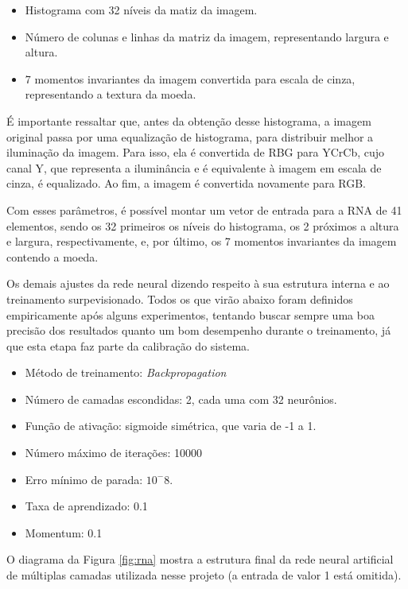 \documentclass[10pt,journal,compsoc]{IEEEtran}
\begin{document}
\begin{itemize}  
\item Histograma com 32 níveis da matiz da imagem.
\item Número de colunas e linhas da matriz da imagem, representando largura e altura.
\item 7 momentos invariantes da imagem convertida para escala de cinza, representando a textura da moeda.
\end{itemize}

É importante ressaltar que, antes da obtenção desse histograma, a imagem original passa por uma equalização de histograma, para distribuir melhor a iluminação da imagem. Para isso, ela é convertida de RBG para YCrCb, cujo canal Y, que representa a iluminância e é equivalente à imagem em escala de cinza, é equalizado. Ao fim, a imagem é convertida novamente para RGB. 

Com esses parâmetros, é possível montar um vetor de entrada para a RNA  de 41 elementos, sendo os 32 primeiros os níveis do histograma, os 2 próximos a altura e largura, respectivamente, e, por último, os 7 momentos invariantes da imagem contendo a moeda. 

Os demais ajustes da rede neural dizendo respeito à sua estrutura interna e ao treinamento surpevisionado. Todos os que virão abaixo foram definidos empiricamente após alguns experimentos, tentando buscar sempre uma boa precisão dos resultados quanto um bom desempenho durante o treinamento, já que esta etapa faz parte da calibração do sistema.

\begin{itemize}  
\item Método de treinamento: \textit{Backpropagation}
\item Número de camadas escondidas: 2, cada uma com 32 neurônios.
\item Função de ativação: sigmoide simétrica, que varia de -1 a 1.
\item Número máximo de iterações: 10000
\item Erro mínimo de parada:  $10 ^ -8$.
\item Taxa de aprendizado: 0.1
\item Momentum: 0.1

\end{itemize}

O diagrama da Figura \ref{fig:rna} mostra a estrutura final da rede neural artificial de múltiplas camadas utilizada nesse projeto (a entrada de valor 1 está omitida).
\end{document}
